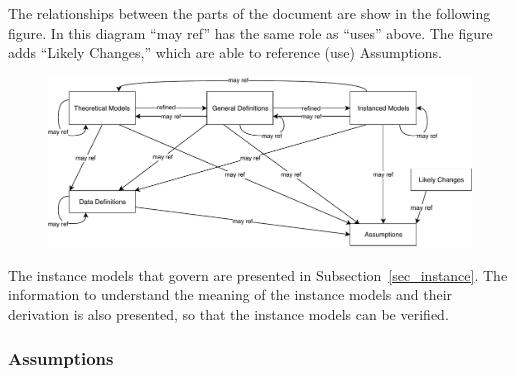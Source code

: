\documentclass[12pt]{article}
\begin{document}



The relationships between the parts of the document are show in
the following figure.  In this diagram ``may ref'' has the same role as
``uses'' above.  The figure adds ``Likely Changes,'' which are able to
reference (use) Assumptions.

\begin{figure}[H]
  \includegraphics[scale=0.9]{RelationsBetweenTM_GD_IM_DD_A.pdf}
\end{figure}

The instance models that govern \progname{} are presented in
Subsection~\ref{sec_instance}.  The information to understand the meaning of the
instance models and their derivation is also presented, so that the instance
models can be verified.

\subsubsection{Assumptions} \label{sec_assumpt}
\end{document}
